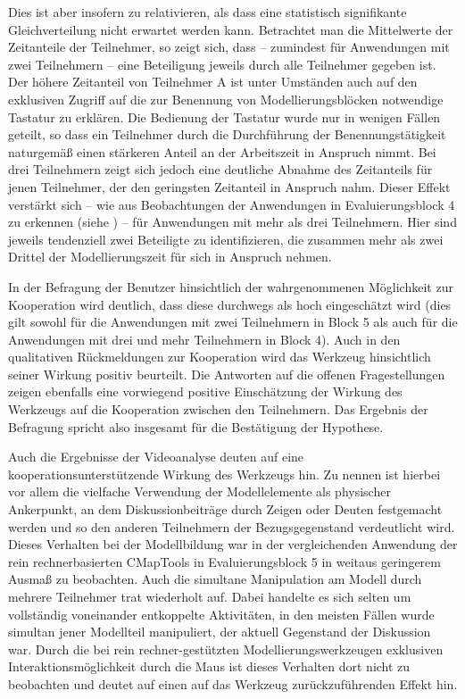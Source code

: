 Dies ist aber insofern zu relativieren, als dass eine statistisch signifikante Gleichverteilung nicht erwartet werden kann. Betrachtet man die Mittelwerte der Zeitanteile der Teilnehmer, so zeigt sich, dass -- zumindest für Anwendungen mit zwei Teilnehmern -- eine Beteiligung jeweils durch alle Teilnehmer gegeben ist. Der höhere Zeitanteil von Teilnehmer A ist unter Umständen auch auf den exklusiven Zugriff auf die zur Benennung von Modellierungsblöcken notwendige Tastatur zu erklären. Die Bedienung der Tastatur wurde nur in wenigen Fällen geteilt, so dass ein Teilnehmer durch die Durchführung der Benennungstätigkeit naturgemäß einen stärkeren Anteil an der Arbeitszeit in Anspruch nimmt. Bei drei Teilnehmern zeigt sich jedoch eine deutliche Abnahme des Zeitanteils für jenen Teilnehmer, der den geringsten Zeitanteil in Anspruch nahm. Dieser Effekt verstärkt sich -- wie aus Beobachtungen der Anwendungen in Evaluierungsblock 4 zu erkennen (siehe \citep{Wahlmuller10}) -- für Anwendungen mit mehr als drei Teilnehmern. Hier sind jeweils tendenziell zwei Beteiligte zu identifizieren, die zusammen mehr als zwei Drittel der Modellierungszeit für sich in Anspruch nehmen.  

In der Befragung der Benutzer hinsichtlich der wahrgenommenen Möglichkeit zur Kooperation wird deutlich, dass diese durchwegs als hoch eingeschätzt wird (dies gilt sowohl für die Anwendungen mit zwei Teilnehmern in Block 5 als auch für die Anwendungen mit drei und mehr Teilnehmern in Block 4). Auch in den qualitativen Rückmeldungen zur Kooperation wird das Werkzeug hinsichtlich seiner Wirkung positiv beurteilt. Die Antworten auf die offenen Fragestellungen zeigen ebenfalls eine vorwiegend positive Einschätzung der Wirkung des Werkzeugs auf die Kooperation zwischen den Teilnehmern. Das Ergebnis der Befragung spricht also insgesamt für die Bestätigung der Hypothese.

Auch die Ergebnisse der Videoanalyse deuten auf eine kooperationsunterstützende Wirkung des Werkzeugs hin. Zu nennen ist hierbei vor allem die vielfache Verwendung der Modellelemente als physischer Ankerpunkt, an dem Diskussionbeiträge durch Zeigen oder Deuten festgemacht werden und so den anderen Teilnehmern der Bezugsgegenstand verdeutlicht wird. Dieses Verhalten bei der Modellbildung war in der vergleichenden Anwendung der rein rechnerbasierten CMapTools in Evaluierungsblock 5 in weitaus geringerem Ausmaß zu beobachten. Auch die simultane Manipulation am Modell durch mehrere Teilnehmer trat wiederholt auf. Dabei handelte es sich selten um vollständig voneinander entkoppelte Aktivitäten, in den meisten Fällen wurde simultan jener Modellteil manipuliert, der aktuell Gegenstand der Diskussion war. Durch die bei rein rechner-gestützten Modellierungswerkzeugen exklusiven Interaktionsmöglichkeit durch die Maus ist dieses Verhalten dort nicht zu beobachten und deutet auf einen auf das Werkzeug zurückzuführenden Effekt hin.   

